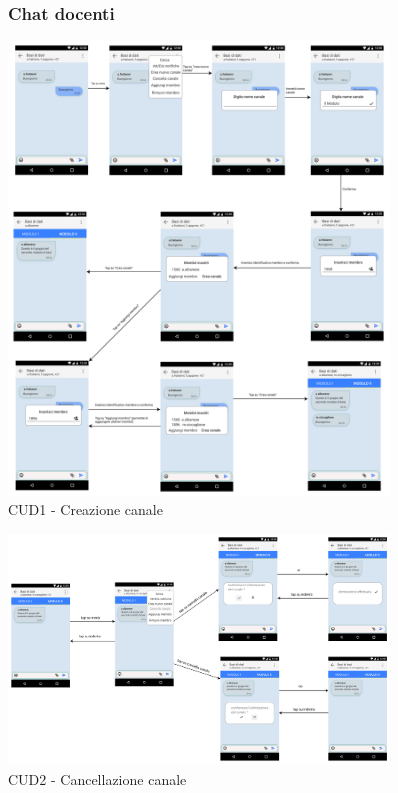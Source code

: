 \pagebreak
\begin{figure}
	\subsubsection{Chat docenti}
	\centering
	\includegraphics[width=0.9\textwidth]{imgs/gruppo6/activities/act_cud1_creazione_canale.pdf}
	\caption{CUD1 - Creazione canale}
	\label{fig:act-cud1}
\end{figure}

\begin{figure}
	\centering
	\includegraphics[width=0.9\textwidth]{imgs/gruppo6/activities/act_cud2_cancella_canale.pdf}
	\caption{CUD2 - Cancellazione canale}
	\label{fig:act-cud2}
\end{figure}

